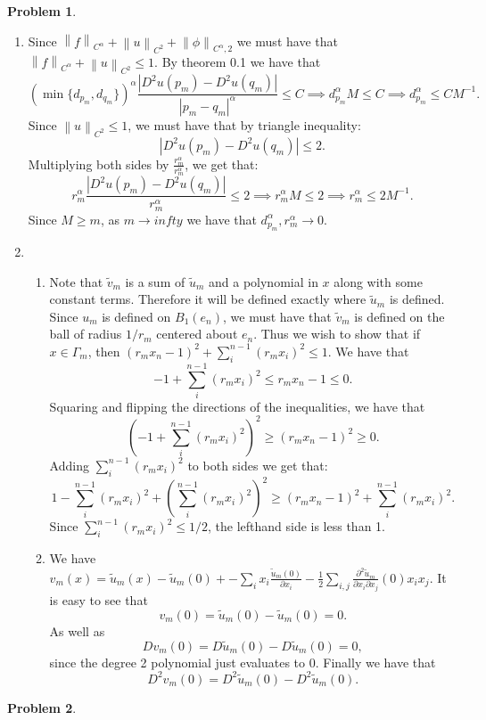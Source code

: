 \documentclass[12pt, a4paper]{article}
\newtheorem{problem}{Problem}
\theoremstyle{definition}
\newcommand{\penum}{ \begin{enumerate}[label=\bf(\alph*), leftmargin=0pt]}
\newcommand{\epenum}{ \end{enumerate} }
\newcommand{\norm}[1]{\left\lVert#1\right\rVert}
\begin{document}
\newpage
\begin{problem}
\end{problem}
\penum
\item Since $\norm{f}_{C^\alpha} + \norm{u}_{C^2} + \norm{\phi}_{C^\alpha,2}$ we must have that $\norm{f}_{C^\alpha} + \norm{u}_{C^2} \leq 1$. By theorem 0.1 we have that 
	$$\left( \min \{d_{p_m} ,d_{q_m} \}\right)^\alpha \frac{|D^2u(p_m) - D^2u(q_m)| }{|p_m-q_m|^\alpha} \leq C \implies d_{p_m}^\alpha M \leq C \implies d_{p_m}^\alpha \leq CM^{-1}.$$
Since $\norm{u}_{C^2} \leq 1$, we must have that by triangle inequality:
$$|D^2u(p_m) - D^2u(q_m)|\leq 2.$$
Multiplying both sides by $\frac{r_m^\alpha}{r_m^\alpha}$, we get that:
$$r^\alpha_m \frac{|D^2u(p_m) - D^2u(q_m)|}{r_m^\alpha}\leq 2 \implies r_m^\alpha M \leq 2 \implies r_m^\alpha \leq 2M^{-1}.$$
Since $M \geq m$, as $m \to infty$ we have that $d_{p_m}^\alpha, r_m^\alpha \to 0$. 
\item 
\begin{enumerate}[label = \roman*) ]
	\item Note that $\tilde{v}_m$ is a sum of $\tilde{u}_m$ and a polynomial in $x$ along with some constant terms. Therefore it will be defined exactly where $\tilde{u}_m$ is defined. Since $u_m$ is defined on $B_1(e_n)$, we must have that $\tilde{v}_m$ is defined on the ball of radius $1/r_m$ centered about $e_n$. Thus we wish to show that if $x\in \Gamma_m$, then $(r_mx_n - 1)^2 + \sum_{i}^{n-1}(r_mx_i)^2 \leq 1$. 
We have that 
		$$-1 + \sum_{i}^{n-1} (r_mx_i)^2 \leq r_mx_n - 1 \leq 0.$$
Squaring and flipping the directions of the inequalities, we have that 
$$ \left(-1 + \sum_{i}^{n-1} (r_mx_i)^2  \right)^2 \geq (r_m x_n- 1)^2 \geq 0. $$
Adding $\sum_{i}^{n-1} (r_m x_i)^2$ to both sides we get that:
		$$1 - \sum_{i}^{n-1} (r_mx_i)^2  + \left(\sum_{i}^{n-1} (r_mx_i)^2 \right)^2 \geq (r_mx_n-1)^2 + \sum_{i}^{n-1}(r_mx_i)^2.$$
Since $\sum_{i}^{n-1} (r_mx_i)^2 \leq 1/2$, the lefthand side is less than 1. 
\item We have $v_m(x) =  \tilde{u}_m(x) - \tilde{u}_m(0) + - \sum_i x_i \frac{\tilde{u}_m(0)}{\partial x_i}  - \frac{1}{2} \sum_{i,j} \frac{\partial^2\tilde{u}_m}{\partial x_i \partial x_j}(0) x_ix_j.$
It is easy to see that 
$$v_m(0) = \tilde{u}_m(0) - \tilde{u}_m(0) = 0.$$
As well as
$$Dv_m(0) = D\tilde{u}_m(0) - D\tilde{u}_m(0) =0 ,$$
since the degree 2 polynomial just evaluates to $0$. 
Finally we have that 
$$D^2 v_m(0) = D^2\tilde{u}_m(0) - D^2 \tilde{u}_m(0). $$
\end{enumerate}
\epenum
\newpage
\begin{problem}
\end{problem}
\newpage
\end{document}
